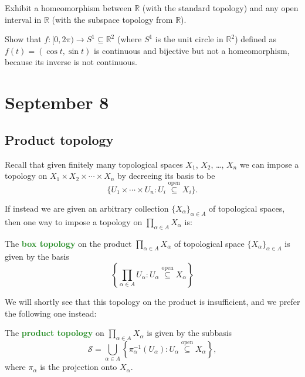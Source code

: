 \documentclass[11pt]{scrartcl}
\providecommand{\RR}{\mathbb R}
\providecommand{\inv}{^{-1}}
\providecommand{\vocab}[1]{{\textbf{\textcolor{ForestGreen}{#1}}}}
\begin{document}
\begin{exercise}
    Exhibit a homeomorphism between $\RR$ (with the standard topology)
    and any open interval in $\RR$ (with the subspace topology from $\RR$).
\end{exercise}

\begin{exercise}
    Show that $f\colon[0,2\pi)\to S^1\subseteq\RR^2$
    (where $S^1$ is the unit circle in $\RR^2$)
    defined as $f(t) = (\cos t, \sin t)$ is continuous and bijective
    but not a homeomorphism, because its inverse is not continuous.
\end{exercise}

\pagebreak

\section{September 8}\label{sec:sep08}

\subsection{Product topology}

Recall that given finitely many topological spaces
$X_1$, $X_2$, \dots, $X_n$ we can impose a topology on
$X_1\times X_2\times\cdots\times X_n$
by decreeing its basis to be
\begin{equation*}
    \{U_1\times\cdots\times U_n : U_i\overset{\text{open}}\subseteq X_i\}.
\end{equation*}

If instead we are given an arbitrary collection $\{X_\alpha\}_{\alpha\in A}$
of topological spaces, then one way to impose a topology on
$\prod_{\alpha\in A}X_\alpha$ is:
\begin{definition}
    \label{def:box-top}
    The \vocab{box topology} on the product $\prod_{\alpha\in A}X_{\alpha}$
    of topological space $\{X_\alpha\}_{\alpha\in A}$
    is given by the basis
    \begin{equation*}
	\left\{\prod_{\alpha\in A}U_{\alpha} :
	U_\alpha\overset{\text{open}}\subseteq X_\alpha\right\}
    \end{equation*}
\end{definition}

We will shortly see that this topology on the product is insufficient,
and we prefer the following one instead:
\begin{definition}
    \label{def:inf-product-top}
    The \vocab{product topology} on $\prod_{\alpha\in A} X_{\alpha}$
    is given by the subbasis
    \begin{equation*}
	\mathcal S = \bigcup_{\alpha\in A}
	\left\{\pi_\alpha\inv(U_\alpha) :
	U_{\alpha}\overset{\text{open}}\subseteq X_\alpha\right\},
    \end{equation*}
    where $\pi_\alpha$ is the projection onto $X_\alpha$.
\end{definition}
\end{document}
